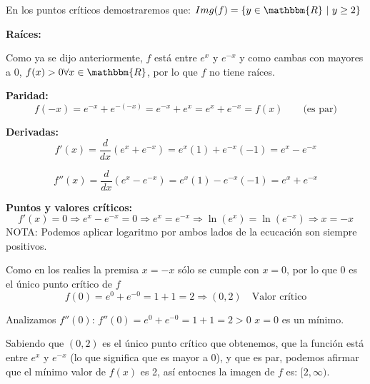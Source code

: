 \documentclass[12pt]{article}
\begin{document}
\begin{enumerate}[\hspace{9px} a)]
            En los puntos cr\'iticos demostraremos que: \(Img(f)=\{y\in\mathbbm{R} \ | \ y\geq2\}\)\medskip

        \textbf{Ra\'ices: }\medskip

            Como ya se dijo anteriormente, \(f\) est\'a entre \(e^x\) y \(e^{-x}\) y como cambas con mayores a 0, \(f(x)>0 \forall x \in \mathbbm{R}\), por lo que \(f\) no tiene ra\'ices.\medskip

        \textbf{Paridad: }
            \begin{equation*}
                f(-x) = e^{-x}+e^{-(-x)} = e^{-x}+e^x = e^x+e^{-x} = f(x) \qquad \text{(es par)}
            \end{equation*}

        \textbf{Derivadas: }
            \begin{equation*}
                f'(x) = \frac{d}{dx}\left(e^x+e^{-x}\right) = e^x(1)+e^{-x}(-1) = e^x-e^{-x}
            \end{equation*}

            \begin{equation*}
                f''(x) = \frac{d}{dx}\left(e^x-e^{-x}\right) = e^x(1)-e^{-x}(-1) = e^x+e^{-x}
            \end{equation*}

        \textbf{Puntos y valores cr\'iticos: }
            \begin{equation*}
                f'(x)=0 \Rightarrow e^x-e^{-x}=0 \Rightarrow e^x=e^{-x} \Rightarrow \ln(e^x)=\ln(e^{-x}) \Rightarrow x=-x
            \end{equation*}
            NOTA: Podemos aplicar logaritmo por ambos lados de la ecucaci\'on son siempre positivos.\medskip

            Como en los realies la premisa \(x = -x\) s\'olo se cumple con \(x=0\), por lo que 0 es el \'unico punto cr\'itico de \(f\)
            \begin{equation*}
                f(0)=e^0+e^{-0}=1+1=2 \Longrightarrow (0,2) \quad \text{Valor crítico}
            \end{equation*}

            Analizamos \(f''(0)\): \quad \(f''(0)=e^0+e^{-0}=1+1=2>0\) \(x=0\) es un m\'inimo.\medskip

            Sabiendo que \((0,2)\) es el \'unico punto cr\'itico que obtenemos, que la funci\'on est\'a entre \(e^x\) y \(e^{-x}\) (lo que significa que es mayor a 0), y que es par, podemos afirmar que el m\'inimo valor de \(f(x)\) es 2, as\'i entocnes la imagen de \(f\) es: \([2,\infty)\).


\end{enumerate}
\end{document}
